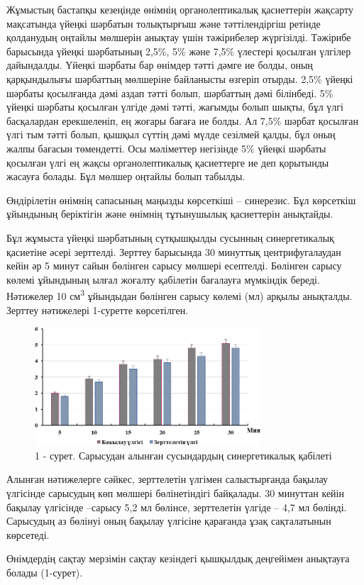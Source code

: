 \begin{multicols}{2}
Жұмыстың бастапқы кезеңінде өнімнің органолептикалық қасиеттерін
жақсарту мақсатында үйеңкі шәрбатын толықтырғыш және тәттілендіргіш
ретінде қолданудың оңтайлы мөлшерін анықтау үшін тәжірибелер жүргізілді.
Тәжірибе барысында үйеңкі шәрбатының 2,5\%, 5\% және 7,5\% үлестері
қосылған үлгілер дайындалды. Үйеңкі шәрбаты бар өнімдер тәтті дәмге ие
болды, оның қарқындылығы шәрбаттың мөлшеріне байланысты өзгеріп отырды.
2,5\% үйеңкі шәрбаты қосылғанда дәмі аздап тәтті болып, шәрбаттың дәмі
білінбеді. 5\% үйеңкі шәрбаты қосылған үлгіде дәмі тәтті, жағымды болып
шықты, бұл үлгі басқалардан ерекшеленіп, ең жоғары бағаға ие болды. Ал
7,5\% шәрбат қосылған үлгі тым тәтті болып, қышқыл сүттің дәмі мүлде
сезілмей қалды, бұл оның жалпы бағасын төмендетті. Осы мәліметтер
негізінде 5\% үйеңкі шәрбаты қосылған үлгі ең жақсы органолептикалық
қасиеттерге ие деп қорытынды жасауға болады. Бұл мөлшер оңтайлы болып
табылды.

Өндірілетін өнімнің сапасының маңызды көрсеткіші -- синерезис. Бұл
көрсеткіш ұйындының беріктігін және өнімнің тұтынушылық қасиеттерін
анықтайды.

Бұл жұмыста үйеңкі шәрбатының сүтқышқылды сусынның синергетикалық
қасиетіне әсері зерттелді. Зерттеу барысында 30 минуттық
центрифугалаудан кейін әр 5 минут сайын бөлінген сарысу мөлшері
есептелді. Бөлінген сарысу көлемі ұйындының ылғал жоғалту қабілетін
бағалауға мүмкіндік береді. Нәтижелер 10 см\textsuperscript{3} ұйындыдан
бөлінген сарысу көлемі (мл) арқылы анықталды. Зерттеу нәтижелері
1-суретте көрсетілген.
\end{multicols}

\begin{figure}[H]
	\centering
	\includegraphics[width=0.75\textwidth]{media/pish4/image2}
	\caption*{1 - сурет. Сарысудан алынған сусындардың синергетикалық қабілеті}
\end{figure}

\begin{multicols}{2}
Алынған нәтижелерге сәйкес, зерттелетін үлгімен салыстырғанда бақылау
үлгісінде сарысудың көп мөлшері бөлінетіндігі байқалады. 30 минуттан
кейін бақылау үлгісінде --сарысу 5,2 мл бөлінсе, зерттелетін үлгіде --
4,7 мл бөлінді. Сарысудың аз бөлінуі оның бақылау үлгісіне қарағанда
ұзақ сақталатынын көрсетеді.

Өнімдердің сақтау мерзімін сақтау кезіндегі қышқылдық деңгейімен
анықтауға болады (1-сурет).
\end{multicols}

